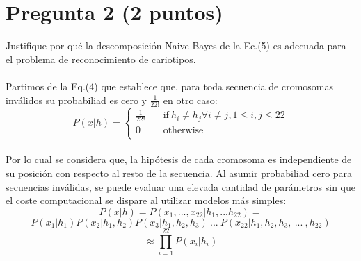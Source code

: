 \documentclass[12pt]{article}
\begin{document}
\section*{Pregunta 2 (2 puntos)}
Justifique por qué la descomposición Naive Bayes de la Ec.(5) es adecuada para el problema de reconocimiento de cariotipos.
\\\\
Partimos de la Eq.(4) que establece que, para toda secuencia de cromosomas inválidos su probabiliad es cero y $ \frac{1}{22!} $ en otro caso:
\\

\begin{equation*}
    P(x|h) =  
    \begin{cases}
        \frac{1}{22!} &\quad\text{if} ~ h_i \neq h_j \forall i \neq j, 1 \leq i, j \leq 22 \\
        \text{0} &\quad\text{otherwise} \\ 
      \end{cases}
\end{equation*}
\\
Por lo cual se considera que, la hipótesis de cada cromosoma es independiente de su posición con respecto al resto de la secuencia. Al asumir probabiliad cero para secuencias inválidas, se puede evaluar una elevada cantidad de parámetros sin que el coste computacional se dispare al utilizar modelos más simples:
\\
\begin{equation*}
    P(x|h) = P(x_1, ... , x_{22} | h_1, ... h_{22}) = 
\end{equation*}
\begin{equation*}
     P(x_1 | h_1) P(x_2 | h_1, h_2) P(x_3 | h_1, h_2, h_3)~...~P(x_{22} | h_1, h_2, h_3,~...~, h_{22})
\end{equation*}
\begin{equation*}
    \approx \prod_{i=1}^{22}{P(x_i|h_i)} 
\end{equation*}

\newpage
\end{document}
